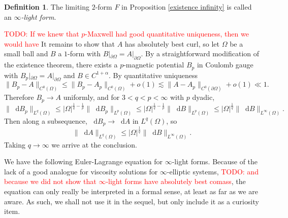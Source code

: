 \documentclass[reqno,11pt]{amsart}
\newcommand*\dif{\mathop{}\!\mathrm{d}}
\newcommand{\dfn}[1]{\emph{#1}\index{#1}}
\theoremstyle{definition}
\newtheorem{definition}[theorem]{Definition}
\numberwithin{equation}{section}
\newcommand\todo[1]{\textcolor{red}{TODO: #1}}
\begin{document}
\begin{definition}
The limiting $2$-form $F$ in Proposition \ref{existence infinity} is called an \dfn{$\infty$-light form}.
\end{definition}

\todo{If we knew that $p$-Maxwell had good quantitative uniqueness, then we would have}
It remains to show that $A$ has absolutely best curl, so let $\Omega$ be a small ball and $B$ a $1$-form with $B|_{\partial \Omega} = A|_{\partial \Omega}$.
By a straightforward modification of the existence theorem, there exists a $p$-magnetic potential $B_p$ in Coulomb gauge with $B_p|_{\partial \Omega} = A|_{\partial \Omega}$ and $B \in C^{1 + \alpha}$.
By quantitative uniqueness
$$\|B_p - A\|_{C^0(\Omega)} \leq \|B_p - A_p\|_{C^0(\Omega)} + o(1) \lesssim \|A - A_p\|_{C^0(\partial \Omega)} + o(1) \ll 1.$$
Therefore $B_p \to A$ uniformly, and for $3 < q < p < \infty$ with $p$ dyadic,
$$\|\dif B_p\|_{L^q(\Omega)} \leq |\Omega|^{\frac{1}{q} -\frac{1}{p}} \|\dif B_p\|_{L^p(\Omega)} \leq |\Omega|^{\frac{1}{q} -\frac{1}{p}} \|\dif B\|_{L^p(\Omega)} \leq |\Omega|^{\frac{1}{q}} \|\dif B\|_{L^\infty(\Omega)}.$$
Then along a subsequence, $\dif B_p \to \dif A$ in $L^q(\Omega)$, so 
$$\|\dif A\|_{L^q(\Omega)} \leq |\Omega|^{\frac{1}{q}} \|\dif B\|_{L^\infty(\Omega)}.$$
Taking $q \to \infty$ we arrive at the conclusion.

We have the following Euler-Lagrange equation for $\infty$-light forms.
Because of the lack of a good analogue for viscosity solutions for $\infty$-elliptic systems, \todo{and because we did not show that $\infty$-light forms have absolutely best comass}, the equation can only really be interpreted in a formal sense, at least as far as we are aware.
As such, we shall not use it in the sequel, but only include it as a curiosity item.
\end{document}
